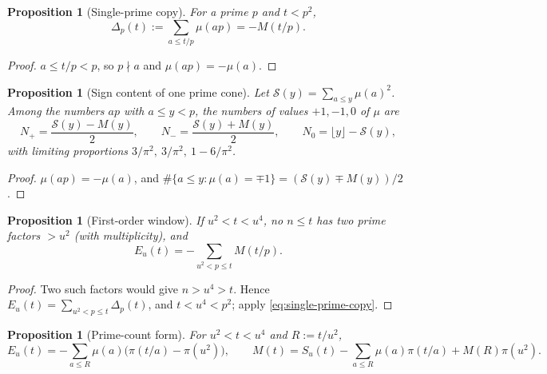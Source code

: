 \documentclass[11pt]{amsart}
\numberwithin{equation}{section}
\theoremstyle{plain}
\newtheorem{proposition}[theorem]{Proposition}
\theoremstyle{definition}
\theoremstyle{remark}
\newcommand{\Sq}{\mathcal{S}}
\begin{document}
\begin{proposition}[Single-prime copy]
\label{prop:single_prime_copy}
For a prime $p$ and $t<p^2$,
\begin{equation}
\label{eq:single-prime-copy}
  \Delta_p(t):=\sum_{a\le t/p}\mu(ap)=-M(t/p).
\end{equation}
\end{proposition}

\begin{proof}
$a\le t/p<p$, so $p\nmid a$ and $\mu(ap)=-\mu(a)$.
\end{proof}

\begin{proposition}[Sign content of one prime cone]
\label{prop:prime-cone-signs}
Let $\Sq(y)=\sum_{a\le y}\mu(a)^2$. Among the numbers $ap$ with $a\le y<p$,
the numbers of values $+1,-1,0$ of $\mu$ are
\begin{equation}
\label{eq:cone_counts}
  N_+=\frac{\Sq(y)-M(y)}{2},\qquad N_-=\frac{\Sq(y)+M(y)}{2},\qquad
  N_0=\lfloor y\rfloor-\Sq(y),
\end{equation}
with limiting proportions $3/\pi^2,\ 3/\pi^2,\ 1-6/\pi^2$.
\end{proposition}

\begin{proof}
$\mu(ap)=-\mu(a)$, and $\#\{a\le y:\mu(a)=\mp1\}=(\Sq(y)\mp M(y))/2$.
\end{proof}

\begin{proposition}[First-order window]
\label{prop:linear-new-primes}
If $u^2<t<u^4$, no $n\le t$ has two prime factors $>u^2$ (with
multiplicity), and
\begin{equation}
\label{eq:first-order-total}
  E_u(t)=-\sum_{u^2<p\le t}M(t/p).
\end{equation}
\end{proposition}

\begin{proof}
Two such factors would give $n>u^4>t$. Hence $E_u(t)=\sum_{u^2<p\le t}
\Delta_p(t)$, and $t<u^4<p^2$; apply \eqref{eq:single-prime-copy}.
\end{proof}

\begin{proposition}[Prime-count form]
\label{prop:prime_count_form}
For $u^2<t<u^4$ and $R:=t/u^2$,
\begin{equation}
\label{eq:prime_count_form}
  E_u(t)=-\sum_{a\le R}\mu(a)\bigl(\pi(t/a)-\pi(u^2)\bigr),
  \qquad
  M(t)=S_u(t)-\sum_{a\le R}\mu(a)\pi(t/a)+M(R)\pi(u^2).
\end{equation}
\end{proposition}
\end{document}
